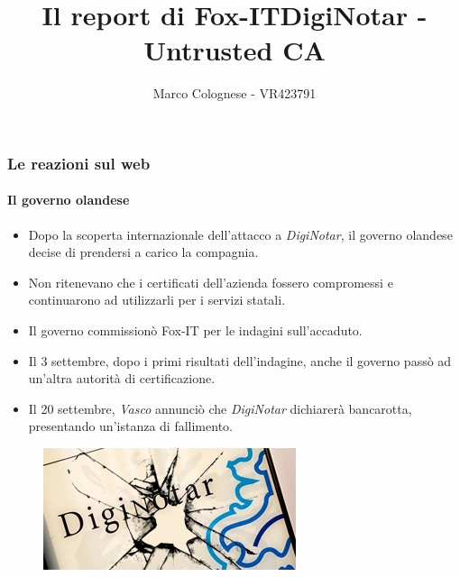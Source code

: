 \documentclass{beamer}
\begin{document}
\begin{frame}
\frametitle{Le reazioni sul web}
\framesubtitle{Il governo olandese}
\begin{itemize}
	\item Dopo la scoperta internazionale dell'attacco a \textit{DigiNotar}, il \alert{governo olandese} decise di prendersi a carico la compagnia.
	\item Non ritenevano che i certificati dell'azienda fossero compromessi e continuarono ad utilizzarli per i servizi statali.
	\item Il governo commissionò \alert{Fox-IT} per le indagini sull'accaduto.
	\item Il 3 settembre, dopo i primi risultati dell'indagine, anche il governo passò ad un'altra autorità di certificazione.
	\item Il 20 settembre, \textit{Vasco} annunciò che \textit{DigiNotar} dichiarerà \alert{bancarotta}, presentando un'istanza di fallimento.
\end{itemize}
\begin{figure}[H]
	\centering
	\includegraphics[scale=0.5]{digibreak}
\end{figure}
\end{frame}


\title{Il report di Fox-IT}
\subtitle{}
\institute{}
\author{}
\begin{frame}
	\titlepage
\end{frame}
\title{DigiNotar - Untrusted CA}
\author{Marco Colognese - VR423791}
\end{document}
